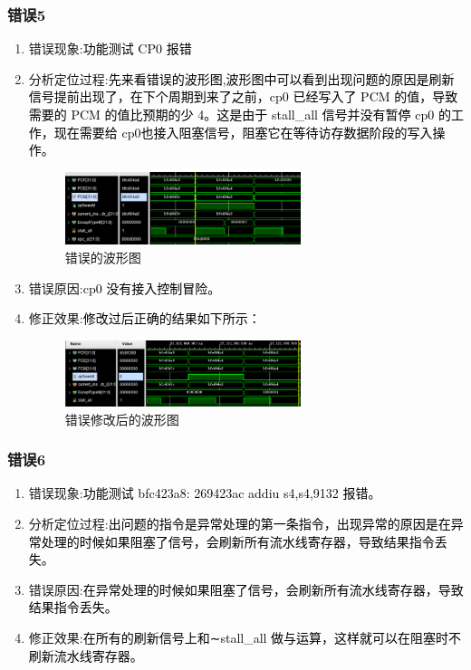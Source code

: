 \subsubsection{错误5}
\begin{enumerate}[(1)]
    \item 错误现象:\textcolor{black}{功能测试 CP0 报错}
    \item 分析定位过程:\textcolor{black}{先来看错误的波形图,波形图中可以看到出现问题的原因是刷新信号提前出现了，在下个周期到来了之前，cp0 已经写入了 PCM 的值，导致需要的 PCM 的值比预期的少 4。这是由于 stall\_all 信号并没有暂停 cp0 的工作，现在需要给 cp0也接入阻塞信号，阻塞它在等待访存数据阶段的写入操作。}
    
    \begin{figure}[htbp]
        \centering
        \includegraphics[width=0.65\textwidth]{image/wave3.png}
        \caption{错误的波形图}
    \end{figure}
    
    \item 错误原因:\textcolor{black}{cp0 没有接入控制冒险。}
    \item 修正效果:\textcolor{black}{修改过后正确的结果如下所示：}
    \begin{figure}[htbp]
        \centering
        \includegraphics[width=0.65\textwidth]{image/wave4 (2).png}
        \caption{错误修改后的波形图}
    \end{figure}
\end{enumerate}

\subsubsection{错误6}
\begin{enumerate}[(1)]
    \item 错误现象:\textcolor{black}{功能测试 bfc423a8: 269423ac addiu s4,s4,9132 报错。}
    \item 分析定位过程:\textcolor{black}{出问题的指令是异常处理的第一条指令，出现异常的原因是在异常处理的时候如果阻塞了信号，会刷新所有流水线寄存器，导致结果指令丢失。}
    \item 错误原因:\textcolor{black}{在异常处理的时候如果阻塞了信号，会刷新所有流水线寄存器，导致结果指令丢失。}
    \item 修正效果:\textcolor{black}{在所有的刷新信号上和∼stall\_all 做与运算，这样就可以在阻塞时不刷新流水线寄存器。}
\end{enumerate}

